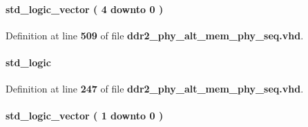 \paragraph[{dqs\+\_\+group\+\_\+sel}]{ {\bfseries \textcolor{comment}{std\+\_\+logic\+\_\+vector}\textcolor{vhdlchar}{ }\textcolor{vhdlchar}{(}\textcolor{vhdlchar}{ }\textcolor{vhdlchar}{ } \textcolor{vhdldigit}{4} \textcolor{vhdlchar}{ }\textcolor{keywordflow}{downto}\textcolor{vhdlchar}{ }\textcolor{vhdlchar}{ } \textcolor{vhdldigit}{0} \textcolor{vhdlchar}{ }\textcolor{vhdlchar}{)}\textcolor{vhdlchar}{ }} \hspace{0.3cm}{\ttfamily [Record]}}\label{classddr2__phy__alt__mem__phy__record__pkg_a9b5c5ad165d3028d6a7934339f844740}


Definition at line {\bf 509} of file {\bf ddr2\+\_\+phy\+\_\+alt\+\_\+mem\+\_\+phy\+\_\+seq.\+vhd}.

\paragraph[{err}]{ {\bfseries \textcolor{comment}{std\+\_\+logic}\textcolor{vhdlchar}{ }} \hspace{0.3cm}{\ttfamily [Record]}}\label{classddr2__phy__alt__mem__phy__record__pkg_aa268b8ef92791914a2e87689dcb358d1}


Definition at line {\bf 247} of file {\bf ddr2\+\_\+phy\+\_\+alt\+\_\+mem\+\_\+phy\+\_\+seq.\+vhd}.

\paragraph[{err}]{ {\bfseries \textcolor{comment}{std\+\_\+logic\+\_\+vector}\textcolor{vhdlchar}{ }\textcolor{vhdlchar}{(}\textcolor{vhdlchar}{ }\textcolor{vhdlchar}{ } \textcolor{vhdldigit}{1} \textcolor{vhdlchar}{ }\textcolor{keywordflow}{downto}\textcolor{vhdlchar}{ }\textcolor{vhdlchar}{ } \textcolor{vhdldigit}{0} \textcolor{vhdlchar}{ }\textcolor{vhdlchar}{)}\textcolor{vhdlchar}{ }} \hspace{0.3cm}{\ttfamily [Record]}}\label{classddr2__phy__alt__mem__phy__record__pkg_abdff98f0802a6d754e84a1b787042d11}


